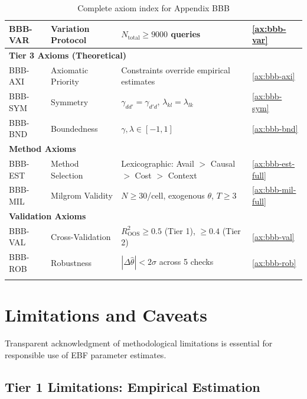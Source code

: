 \documentclass[11pt,a4paper]{article}
\theoremstyle{definition}
\begin{document}
\begin{longtable}{llp{7cm}l}
BBB-VAR & Variation Protocol & $N_{\text{total}} \geq 9000$ queries & \ref{ax:bbb-var} \\
\midrule
\multicolumn{4}{l}{\textbf{Tier 3 Axioms (Theoretical)}} \\
BBB-AXI & Axiomatic Priority & Constraints override empirical estimates & \ref{ax:bbb-axi} \\
BBB-SYM & Symmetry & $\gamma_{dd'} = \gamma_{d'd}$, $\lambda_{kl} = \lambda_{lk}$ & \ref{ax:bbb-sym} \\
BBB-BND & Boundedness & $\gamma, \lambda \in [-1, 1]$ & \ref{ax:bbb-bnd} \\
\midrule
\multicolumn{4}{l}{\textbf{Method Axioms}} \\
BBB-EST & Method Selection & Lexicographic: Avail $>$ Causal $>$ Cost $>$ Context & \ref{ax:bbb-est-full} \\
BBB-MIL & Milgrom Validity & $N \geq 30$/cell, exogenous $\theta$, $T \geq 3$ & \ref{ax:bbb-mil-full} \\
\midrule
\multicolumn{4}{l}{\textbf{Validation Axioms}} \\
BBB-VAL & Cross-Validation & $R^2_{\text{OOS}} \geq 0.5$ (Tier 1), $\geq 0.4$ (Tier 2) & \ref{ax:bbb-val} \\
BBB-ROB & Robustness & $|\Delta\hat{\theta}| < 2\sigma$ across 5 checks & \ref{ax:bbb-rob} \\
\bottomrule
\caption{Complete axiom index for Appendix BBB}
\label{tab:bbb-axiom-index}
\end{longtable}





\section{Limitations and Caveats}
\label{sec:bbb-limitations}

Transparent acknowledgment of methodological limitations is essential for 
responsible use of EBF parameter estimates.

\subsection{Tier 1 Limitations: Empirical Estimation}
\end{document}
